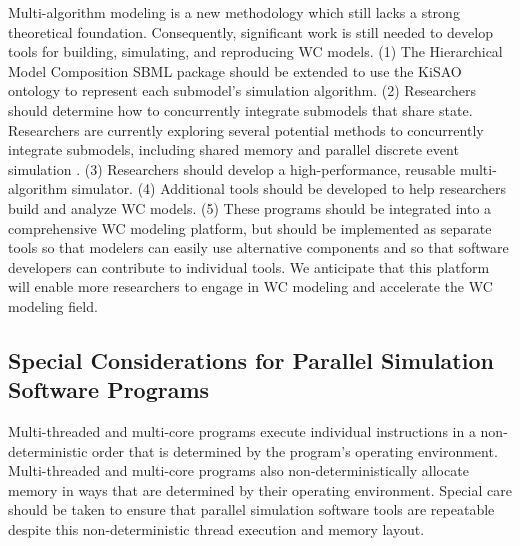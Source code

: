 \documentclass[journal,transmag,twoside]{IEEEtran}
\begin{document}
Multi-algorithm modeling is a new methodology which still lacks a strong theoretical foundation. Consequently, significant work is still needed to develop tools for building, simulating, and reproducing WC models. (1) The Hierarchical Model Composition SBML package should be extended to use the KiSAO ontology \cite{courtot2011controlled} to represent each submodel's simulation algorithm. (2) Researchers should determine how to concurrently integrate submodels that share state. Researchers are currently exploring several potential methods to concurrently integrate submodels, including shared memory and parallel discrete event simulation \cite{Goldberg2016}. (3) Researchers should develop a high-performance, reusable multi-algorithm simulator. (4) Additional tools should be developed to help researchers build and analyze WC models. (5) These programs should be integrated into a comprehensive WC modeling platform, but should be implemented as separate tools so that modelers can easily use alternative components and so that software developers can contribute to individual tools. We anticipate that this platform will enable more researchers to engage in WC modeling and accelerate the WC modeling field.

\subsection{Special Considerations for Parallel Simulation Software Programs}

Multi-threaded and multi-core programs execute individual instructions in a non-deterministic order that is determined by the program's operating environment. Multi-threaded and multi-core programs also non-deterministically allocate memory in ways that are determined by their operating environment. Special care should be taken to ensure that parallel simulation software tools are repeatable despite this non-deterministic thread execution and memory layout.
\end{document}
